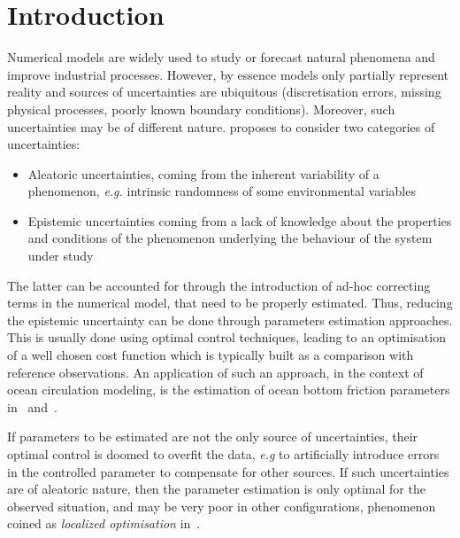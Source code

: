 \documentclass[../../Main_ManuscritThese.tex]{subfiles}
\begin{document}
\chapter*{Introduction}
\TitleBtwLines

{}
\label{chap:Introduction}

\subfileLocal{\pagestyle{introStyle}}




Numerical models are widely used to study or forecast natural
phenomena and improve industrial processes. However, by essence models
only partially represent reality and sources of uncertainties are
ubiquitous (discretisation errors, missing physical processes, poorly
known boundary conditions).  Moreover, such uncertainties may be of
different nature. \cite{walker_defining_2003} proposes to consider two
categories of uncertainties:
\begin{itemize}
\item Aleatoric uncertainties, coming from the inherent variability of
a phenomenon, \emph{e.g.} intrinsic randomness of some environmental
variables
\item Epistemic uncertainties coming from a lack of knowledge about
the properties and conditions of the phenomenon underlying the
behaviour of the system under study
\end{itemize} The latter can be accounted for through the introduction
of ad-hoc correcting terms in the numerical model, that need to be
properly estimated. Thus, reducing the epistemic uncertainty can be
done through parameters estimation approaches. This is usually done
using optimal control techniques, leading to an optimisation of a well
chosen cost function which is typically built as a comparison with
reference observations.
  An application of such an approach, in the context of ocean
circulation modeling, is the estimation of ocean bottom friction
parameters in~\cite{das_estimation_1991}
and~\cite{boutet_estimation_2015}.

  If parameters to be estimated are not the only source of
uncertainties, their optimal control is doomed to overfit the data,
\emph{e.g} to artificially introduce errors in the controlled
parameter to compensate for other sources. If such uncertainties are
of aleatoric nature, then the parameter estimation is only optimal for
the observed situation, and may be very poor in other configurations,
phenomenon coined as \textit{localized optimisation}
in~\cite{huyse_free-form_2001}.
  
\end{document}
